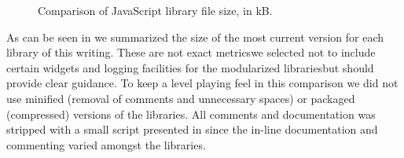 \begin{figure}

  \caption[JavaScript Library Comparison]{%
    Comparison of JavaScript library file size, in kB.
  }
  \label{figure:chart.javascript.size}
\end{figure}

As can be seen in
we summarized the size of the most
current version for each library of this writing. These are not exact
metrics\dash{}we selected not to include certain widgets and logging
facilities for the modularized libraries\dash{}but should provide clear
guidance. To keep a level playing feel in this comparison we did not use
minified (removal of comments and unnecessary spaces) or packaged (compressed)
versions of the libraries. All comments and documentation was stripped with a
small script presented in 
since the in-line documentation and commenting varied amongst the libraries.

